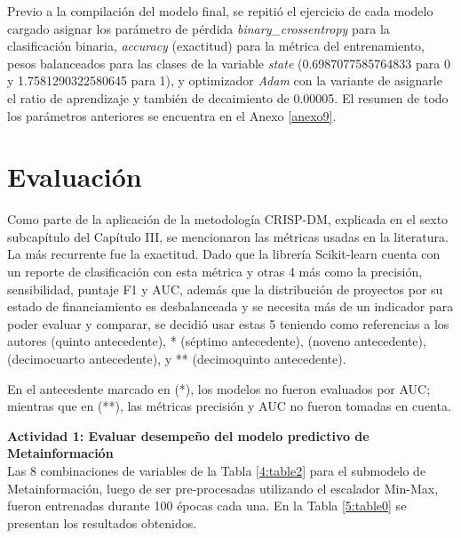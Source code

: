 Previo a la compilación del modelo final, se repitió el ejercicio de cada modelo cargado asignar los parámetro de pérdida \textit{binary\_crossentropy} para la clasificación binaria, \textit{accuracy} (exactitud) para la métrica del entrenamiento, pesos balanceados para las clases de la variable \textit{state} (0.6987077585764833 para 0 y 1.7581290322580645 para 1), y optimizador \textit{Adam} con la variante de asignarle el ratio de aprendizaje y también de decaimiento de 0.00005. El resumen de todo los parámetros anteriores se encuentra en el Anexo \ref{anexo9}.


\section{Evaluación}
Como parte de la aplicación de la metodología CRISP-DM, explicada en el sexto subcapítulo del Capítulo III, se mencionaron las métricas usadas en la literatura. La más recurrente fue la exactitud. Dado que la librería Scikit-learn cuenta con un reporte de clasificación con esta métrica y otras 4 más como la precisión, sensibilidad, puntaje F1 y AUC, además que la distribución de proyectos por su estado de financiamiento es desbalanceada y se necesita más de un indicador para poder evaluar y comparar, se decidió usar estas 5 teniendo como referencias a los autores \citeauthor{pr_beckwith2016predcrowd} (quinto antecedente), \citeauthor{pr_yuan2016textanalytics}* (séptimo antecedente), \citeauthor{pr_kaur2017socmedcrowd} (noveno antecedente), \citeauthor{pr_cheng2019deeplearning} (decimocuarto antecedente), y \citeauthor{pr_chen2019keywords_crowdfunding}** (decimoquinto antecedente).

En el antecedente marcado en (*), los modelos no fueron evaluados por AUC; mientras que en (**), las métricas precisión y AUC no fueron tomadas en cuenta.

\vspace{0.5cm}
\textbf{Actividad 1: Evaluar desempeño del modelo predictivo de Metainformación}
\\
Las 8 combinaciones de variables de la Tabla \ref{4:table2} para el submodelo de Metainformación, luego de ser pre-procesadas utilizando el escalador Min-Max, fueron entrenadas durante 100 épocas cada una. En la Tabla \ref{5:table0} se presentan los resultados obtenidos.

